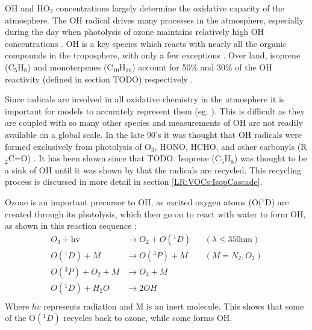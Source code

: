     
      OH and HO$_2$ concentrations largely determine the oxidative capacity of the atmosphere.
      The OH radical drives many processes in the atmosphere, especially during the day when photolysis of ozone maintains relatively high OH concentrations \parencite{Atkinson2000}.
      OH is a key species which reacts with nearly all the organic compounds in the troposphere, with only a few exceptions \parencite{Atkinson2000}.
      Over land, isoprene (C$_5$H$_8$) and monoterpenes (C$_{10}$H$_{16}$) account for 50\% and 30\% of the OH reactivity (defined in section TODO) respectively \parencite{Fuentes2000}. %
      
      Since radicals are involved in all oxidative chemistry in the atmosphere it is important for models to accurately represent them (eg. \textcite{Travis2014}).
      This is difficult as they are coupled with so many other species and measurements of OH are not readily available on a global scale.
      In the late 90's it was thought that OH radicals were formed exclusively from photolysis of O$_3$, HONO, HCHO, and other carbonyls (R$_2$C=O) \parencite{Atkinson2000}.
      It has been shown since that TODO. %
      Isoprene (C$_5$H$_8$) was thought to be a sink of OH until it was shown by \textcite{Paulot2009b} that the radicals are recycled.
      This recycling process is discussed in more detail in section \ref{LR:VOCs:IsopCascade}.
      
      Ozone is an important precursor to OH, as excited oxygen atoms (O(${}^1$D) are created through its photolysis, which then go on to react with water to form OH, as shown in this reaction sequence \parencite{Atkinson2000, AtkinsonArey2003}:
      \begin{equation}
        \begin{aligned}
          O_3+\text{hv}     & \to  O_2 + O({}^1D)   && (\lambda \le 350 \text{nm}) \\%
          O({}^1D)+M        & \to  O({}^3P) + M     && (M=N_2, O_2)               \\%
          O({}^3P)+O_2 + M  & \to  O_3 + M          &&                           \\%
          O({}^1D)+H_2O     & \to  2OH              &&                            \\%
        \end{aligned}
        \label{LR:Atmos:Chem:eqn_O3toOH}
      \end{equation}
      Where $hv$ represents radiation and M is an inert molecule.
      This shows that some of the O$({}^1D)$ recycles back to ozone, while some forms OH.
      
